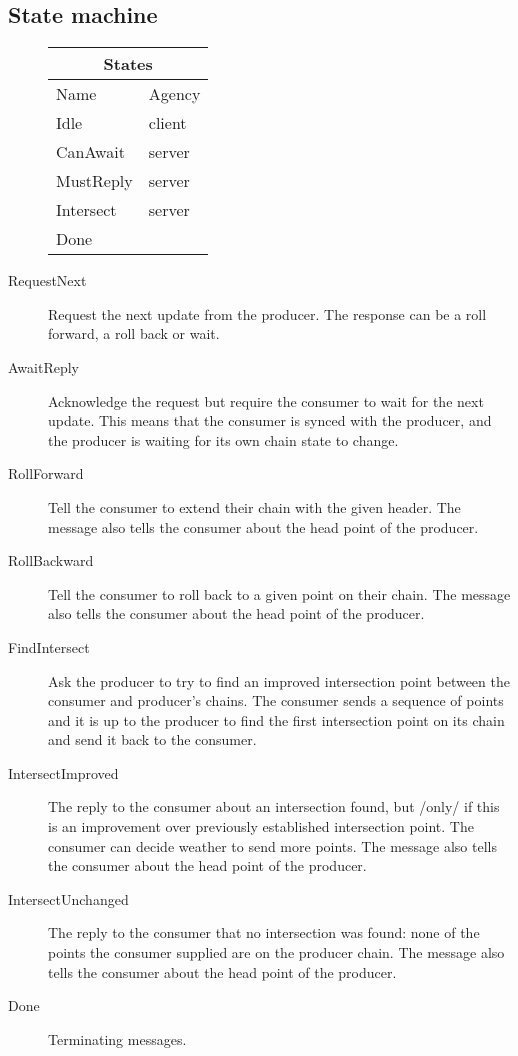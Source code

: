 \documentclass{report}
\theoremstyle{definition}{
  \newtheorem{lemma}{Lemma}[section] %
  \newtheorem{definition}[lemma]{Definition}
}
\theoremstyle{theorem}{
  \newtheorem{invariant}[lemma]{Invariant}
  \newtheorem{proofobligation}[lemma]{Proof Obligation}
}
\numberwithin{equation}{lemma}
\begin{document}
\subsection{State machine}
\begin{figure}[H]
\begin{tabular}{|l|l|}
  \hline
  \multicolumn{2}{|c|}{States} \\ \hline
  Name  & Agency \\ \hline \hline
  Idle       & client \\ \hline
  CanAwait   & server \\ \hline
  MustReply  & server \\ \hline
  Intersect  & server \\ \hline
  Done       &        \\ \hline
\end{tabular}
\end{figure}

\begin{description}
\item[RequestNext]
  Request the next update from the producer.
  The response can be a roll forward, a roll back or wait.

\item[AwaitReply]
  Acknowledge the request but require the consumer to wait for the next update.
  This means that the consumer is synced with the producer, and
  the producer is waiting for its own chain state to change.

\item[RollForward]
  Tell the consumer to extend their chain with the given header.
  The message also tells the consumer about the head point of the producer.

\item[RollBackward]
  Tell the consumer to roll back to a given point on their chain.
  The message also tells the consumer about the head point of the producer.

\item[FindIntersect]
  Ask the producer to try to find an improved intersection point between
  the consumer and producer's chains.
  The consumer sends a sequence of points and it is up to the producer
  to find the first intersection point on its chain and send it back to the consumer.

\item[IntersectImproved]
  The reply to the consumer about an intersection found, but /only/ if this
  is an improvement over previously established intersection point.
  The consumer can decide weather to send more points.
  The message also tells the consumer about the head point of the producer.

\item[IntersectUnchanged]
  The reply to the consumer that no intersection was found: none of the
  points the consumer supplied are on the producer chain.
  The message also tells the consumer about the head point of the producer.

\item[Done]
  Terminating messages.

\end{description}
\end{document}
